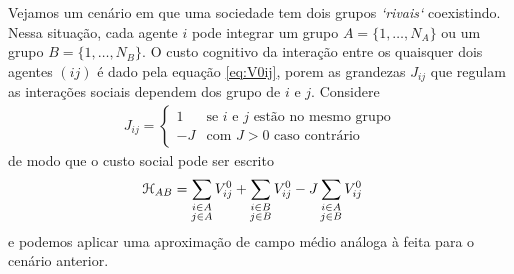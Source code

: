 Vejamos um cenário em que uma sociedade tem dois grupos \emph{`rivais`} coexistindo.
Nessa situação, cada agente $i$ pode integrar um grupo $A=\{1,\dots,N_A\}$ ou um grupo $B=\{1,\dots,N_B\}$.
O custo cognitivo da interação entre os quaisquer dois agentes $(ij)$ é dado pela equação \eqref{eq:V0ij}, porem as grandezas $J_{ij}$ que regulam as interações sociais dependem dos grupo de $i$ e $j$.
Considere
\begin{align}\label{eq:J-antiferro}
  J_{ij} =
  \begin{cases}
    1 & \text{se $i$ e $j$ estão no mesmo grupo} \\
    -J & \text{com $J > 0$ caso contrário}
  \end{cases}
\end{align}
de modo que o custo social pode ser escrito
\begin{align}
  \cost_{AB} & = \sum_{\substack{i\in A\\j \in A}} V^0_{ij}
  + \sum_{\substack{i\in B\\j \in B}} V^0_{ij}
  - J\sum_{\substack{i\in A\\j \in B}} V^0_{ij} \label{eq:H-antiferro}
\end{align}
e podemos aplicar uma aproximação de campo médio análoga à feita para o cenário anterior.


